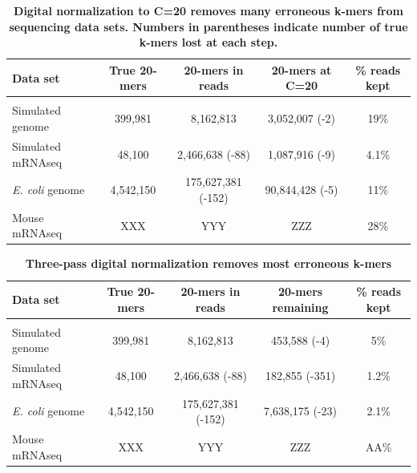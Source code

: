 \documentclass[10pt]{article}
\begin{document}
\begin{table}[!ht]
\caption{
\bf{Digital normalization to C=20 removes many erroneous k-mers from sequencing data sets.  Numbers
in parentheses indicate number of true k-mers lost at each step.}}
\begin{tabular}{|l|c|c|c|c|}
Data set & True 20-mers & 20-mers in reads & 20-mers at C=20 & \% reads kept\\
\hline \\
Simulated genome & 399,981 & 8,162,813 & 3,052,007 (-2) & 19\% \\
Simulated mRNAseq & 48,100 & 2,466,638 (-88) & 1,087,916 (-9) & 4.1\% \\
{\em E. coli} genome & 4,542,150 & 175,627,381 (-152) & 90,844,428 (-5) & 11\% \\
Mouse mRNAseq & XXX & YYY & ZZZ & 28\% \\

\end{tabular}
\begin{flushleft}
\end{flushleft}
\label{tab:normC20}
\end{table}


\begin{table}[!ht]
\caption{
\bf{Three-pass digital normalization removes most erroneous k-mers}}
\begin{tabular}{|l|c|c|c|c|}
Data set & True 20-mers & 20-mers in reads & 20-mers remaining & \% reads kept\\
\hline \\
Simulated genome & 399,981 & 8,162,813 & 453,588 (-4) & 5\% \\
Simulated mRNAseq & 48,100 & 2,466,638 (-88) & 182,855 (-351) & 1.2\% \\
{\em E. coli} genome & 4,542,150 & 175,627,381 (-152) & 7,638,175 (-23) & 2.1\% \\
Mouse mRNAseq & XXX & YYY & ZZZ & AA\% \\
\end{tabular}
\begin{flushleft}
\end{flushleft}
\label{tab:normC5}
\end{table}

\end{document}
